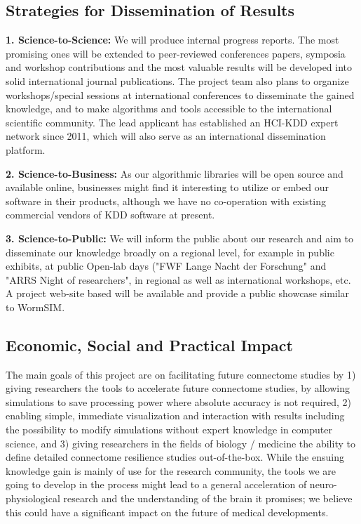 \documentclass[a4paper,11pt]{article}
\begin{document}
\subsection{Strategies for Dissemination of Results}

\textbf{1. Science-to-Science:} We will produce internal progress reports. The most promising ones will be extended to peer-reviewed conferences papers, symposia and workshop contributions and the most valuable results will be developed into solid international journal publications. The project team also plans to organize workshops/special sessions at international conferences to disseminate the gained knowledge, and to make algorithms and tools accessible to the international scientific community. The lead applicant has established an HCI-KDD expert network since 2011, which will also serve as an international dissemination platform.

\textbf{2. Science-to-Business:} As our algorithmic libraries will be open source and available online, businesses might find it interesting to utilize or embed our software in their products, although we have no co-operation with existing commercial vendors of KDD software at present.

\textbf{3. Science-to-Public:} We will inform the public about our research and aim to disseminate our knowledge broadly on a regional level, for example in public exhibits, at public Open-lab days ("FWF Lange Nacht der Forschung" and "ARRS Night of researchers", in regional as well as international workshops, etc. A project web-site based will be available and provide a public showcase similar to WormSIM.

\subsection{Economic, Social and Practical Impact}


The main goals of this project are on facilitating future connectome studies by 1) giving researchers the tools to accelerate future connectome studies, by allowing simulations to save processing power where absolute accuracy is not required, 2) enabling simple, immediate visualization and interaction with results including the possibility to modify simulations without expert knowledge in computer science, and 3) giving researchers in the fields of biology / medicine the ability to define detailed connectome resilience studies out-of-the-box. While the ensuing knowledge gain is mainly of use for the research community, the tools we are going to develop in the process might lead to a general acceleration of neuro-physiological research and the understanding of the brain it promises; we believe this could have a significant impact on the future of medical developments.
\end{document}

